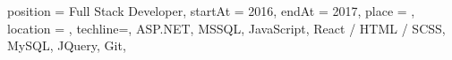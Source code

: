 
\begin{placex}{%
    position = {Full Stack Developer},
    startAt = 2016,
    endAt = 2017,
    place = \eternitech,
    location = \ramatgan,
    techline={, ASP.NET, MSSQL, JavaScript, React / HTML
    / SCSS, MySQL, JQuery, Git},
  }%
  \EtrSPAsForClients
  \EtrMaintainedExistingApps
  \EtrRequirementsAndSpecifications
\end{placex}
